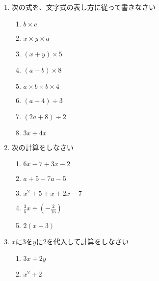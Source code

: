 \documentclass[twocolumn, fleqn]{jsarticle}
\begin{document}



  \begin{enumerate}
    \item 次の式を、文字式の表し方に従って書きなさい 

      \begin{enumerate}
        \item  $ b \times c $
          \vfill
        \item  $x \times y \times a$
          \vfill
        \item  $ (x + y) \times 5 $
          \vfill
        \item $(a-b) \times 8$
          \vfill
        \item $ a \times b \times b \times 4$
          \vfill
        \item $ (a +4)\div  3$
          \vfill
        \item $ (2a +8)\div  2$
          \vfill
        \item $ 3x + 4x$
          \vfill
      \end{enumerate}

    \newpage
  \item 次の計算をしなさい 

      \begin{enumerate}
        \item  $6x -7 +3x -2$
          \vfill
        \item  $ a + 5 -7a -5$
          \vfill
        \item  $x^2 +5 +x + 2x -7$
          \vfill
        \item $\frac{3}{5}x \div(- \frac{2}{15})$
          \vfill
        \item $2(x+3)$
          \vfill
      \end{enumerate}
    \item $x$に3を$y$に2を代入して計算をしなさい 
      \begin{enumerate}
          \item $ 3x +2y $
            \vfill
          \item $ x^2 +2 $
            \vfill
      \end{enumerate}

  \end{enumerate}
\end{document}
